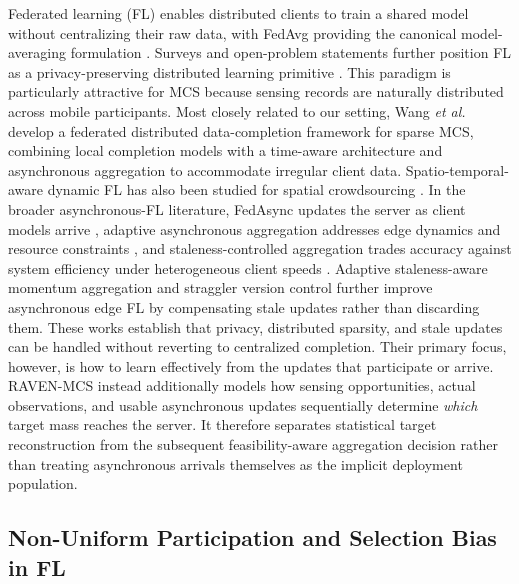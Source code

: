 \documentclass[letterpaper,journal]{IEEEtran}
\begin{document}
Federated learning (FL) enables distributed clients to train a shared model
without centralizing their raw data, with FedAvg providing the canonical
model-averaging formulation \cite{mcmahan2017communication,yang2019federated}.
Surveys and open-problem statements further position FL as a privacy-preserving
distributed learning primitive
\cite{kairouz2021advances,li2020federated}.  This paradigm is
particularly attractive for MCS because sensing records are naturally
distributed across mobile participants.  Most closely related to our setting,
Wang \emph{et al.}~\cite{wang2026federated} develop a federated distributed
data-completion framework for sparse MCS, combining local completion models
with a time-aware architecture and asynchronous aggregation to accommodate
irregular client data.  Spatio-temporal-aware dynamic FL has also been studied
for spatial crowdsourcing \cite{li2026stdfl}.  In the broader asynchronous-FL
literature, FedAsync updates the server as client models arrive
\cite{xie2019asynchronous}, adaptive asynchronous aggregation addresses edge
dynamics and resource constraints \cite{liu2023adaptive}, and
staleness-controlled aggregation trades accuracy against system
efficiency under heterogeneous client speeds \cite{sun2024staleness}.
Adaptive staleness-aware momentum aggregation \cite{qiao2025asmafl} and
straggler version control \cite{chen2026dvafl} further improve asynchronous
edge FL by compensating stale updates rather than discarding them.
These works establish that privacy, distributed sparsity, and stale updates can be
handled without reverting to centralized completion.  Their primary focus,
however, is how to learn effectively from the updates that participate or
arrive.  RAVEN-MCS instead additionally models how sensing opportunities,
actual observations, and usable asynchronous updates sequentially determine
\emph{which} target mass reaches the server.  It therefore separates
statistical target reconstruction from the subsequent feasibility-aware
aggregation decision rather than treating asynchronous arrivals themselves as
the implicit deployment population.

\subsection{Non-Uniform Participation and Selection Bias in FL}
\end{document}
